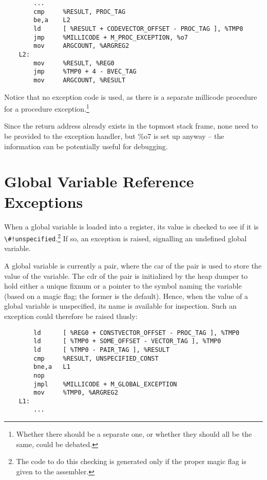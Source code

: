 \begin{minipage}{\linewidth}
\begin{verbatim}
        ...
        cmp     %RESULT, PROC_TAG
        be,a    L2
        ld      [ %RESULT + CODEVECTOR_OFFSET - PROC_TAG ], %TMP0
        jmp     %MILLICODE + M_PROC_EXCEPTION, %o7
        mov     ARGCOUNT, %ARGREG2
    L2:
        mov     %RESULT, %REG0
        jmp     %TMP0 + 4 - BVEC_TAG
        mov     ARGCOUNT, %RESULT
\end{verbatim}
\end{minipage}

Notice that no exception code is used, as there is a separate
millicode procedure for a procedure exception.\footnote{Whether there
should be a separate one, or whether they should all be the same,
could be debated.}

Since the return address already exists in the topmost stack frame,
none need to be provided to the exception handler, but \%o7 is set
up anyway -- the information can be potentially useful for debugging.

\section{Global Variable Reference Exceptions}

When a global variable is loaded into a register, its value is checked
to see if it is \verb+\#!unspecified+.\footnote{The code to do this checking
is generated only if the proper magic flag is given to the assembler.}
If so, an exception is raised, signalling an undefined global variable.

A global variable is currently a pair, where the car of the pair is used
to store the value of the variable. The cdr of the pair is initialized by
the heap dumper to hold either a unique fixnum or a pointer to the symbol
naming the variable (based on a magic flag; the former is the default).
Hence, when the value of a global variable is unspecified, its name is
available for inspection. Such an exception could therefore be raised
thusly:

\begin{minipage}{\linewidth}
\begin{verbatim}
        ld      [ %REG0 + CONSTVECTOR_OFFSET - PROC_TAG ], %TMP0
        ld      [ %TMP0 + SOME_OFFSET - VECTOR_TAG ], %TMP0
        ld      [ %TMP0 - PAIR_TAG ], %RESULT
        cmp     %RESULT, UNSPECIFIED_CONST
        bne,a   L1
        nop
        jmpl    %MILLICODE + M_GLOBAL_EXCEPTION
        mov     %TMP0, %ARGREG2
    L1:
        ...
\end{verbatim}
\end{minipage}

